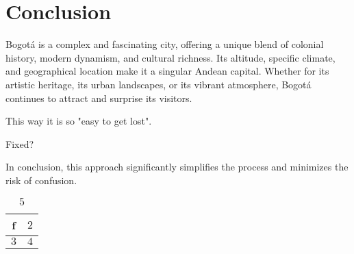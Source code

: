 \documentclass{article}
\begin{document}
\section{Conclusion}
Bogotá is a complex and fascinating city, offering a unique blend of colonial history, modern dynamism, and cultural richness. Its altitude, specific climate, and geographical location make it a singular Andean capital. Whether for its artistic heritage, its urban landscapes, or its vibrant atmosphere, Bogotá continues to attract and surprise its visitors.

This way it is so "easy to get lost".

Fixed?

In conclusion, this approach significantly simplifies the process and minimizes the risk of confusion.

\begin{table}[h!]
    \centering
    \begin{tabular}{|c|c|}
        \hline
        f & $2$ \\
        \hline
        $3$ & $4$ \\
        \hline
    \end{tabular}
    \caption{$5$}
    \label{tab:my_label}
\end{table}
\end{document}
